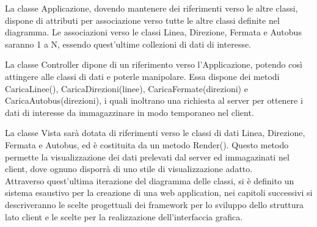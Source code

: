 La classe Applicazione, dovendo mantenere dei riferimenti verso le altre classi, dispone di attributi per associazione verso tutte le altre classi definite nel diagramma. Le associazioni verso le classi Linea, Direzione, Fermata e Autobus saranno 1 a N, essendo quest'ultime collezioni di dati di interesse.

La classe Controller dipone di un riferimento verso l'Applicazione, potendo così attingere alle classi di dati e poterle manipolare. Essa dispone dei metodi CaricaLinee(), CaricaDirezioni(linee), CaricaFermate(direzioni) e CaricaAutobus(direzioni), i quali inoltrano una richiesta al server per ottenere i dati di interesse da immagazzinare in modo temporaneo nel client.

\newpage
La classe Vista sarà dotata di riferimenti verso le classi di dati Linea, Direzione, Fermata e Autobus, ed è costituita da un metodo Render(). Questo metodo permette la visualizzazione dei dati prelevati dal server ed immagazinati nel client, dove ognuno disporrà di uno stile di visualizzazione adatto.\\

Attraverso quest'ultima iterazione del diagramma delle classi, si è definito un sistema esaustivo per la creazione di una web application, nei capitoli successivi si descriveranno le scelte progettuali dei framework per lo sviluppo dello struttura lato client e le scelte per la realizzazione dell'interfaccia grafica.

\newpage
